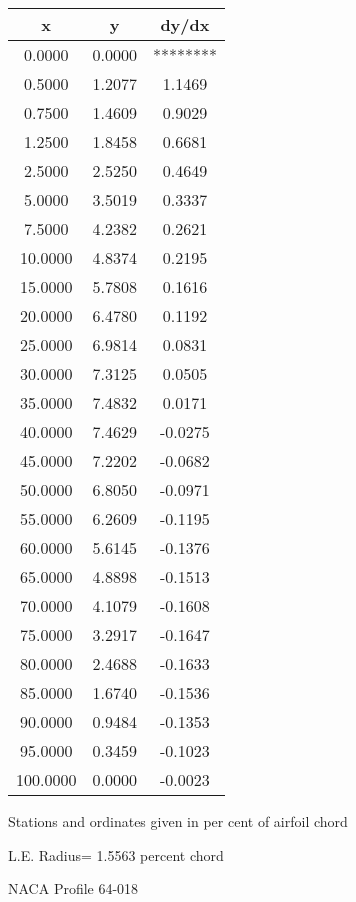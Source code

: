\documentclass[11pt]{book}
\begin{document}
 \vspace{8mm}
 \begin{tabular}{|c|c|c|} \hline 
  x  &  y  &  dy/dx \\
 \hline
0.0000 & 0.0000 & ******** \\
0.5000 & 1.2077 & 1.1469 \\
0.7500 & 1.4609 & 0.9029 \\
1.2500 & 1.8458 & 0.6681 \\
2.5000 & 2.5250 & 0.4649 \\
5.0000 & 3.5019 & 0.3337 \\
7.5000 & 4.2382 & 0.2621 \\
10.0000 & 4.8374 & 0.2195 \\
15.0000 & 5.7808 & 0.1616 \\
20.0000 & 6.4780 & 0.1192 \\
25.0000 & 6.9814 & 0.0831 \\
30.0000 & 7.3125 & 0.0505 \\
35.0000 & 7.4832 & 0.0171 \\
40.0000 & 7.4629 & -0.0275 \\
45.0000 & 7.2202 & -0.0682 \\
50.0000 & 6.8050 & -0.0971 \\
55.0000 & 6.2609 & -0.1195 \\
60.0000 & 5.6145 & -0.1376 \\
65.0000 & 4.8898 & -0.1513 \\
70.0000 & 4.1079 & -0.1608 \\
75.0000 & 3.2917 & -0.1647 \\
80.0000 & 2.4688 & -0.1633 \\
85.0000 & 1.6740 & -0.1536 \\
90.0000 & 0.9484 & -0.1353 \\
95.0000 & 0.3459 & -0.1023 \\
100.0000 & 0.0000 & -0.0023 \\
 \hline
 \end{tabular}
 \vspace{8mm}


Stations and ordinates given in per cent of airfoil chord 


L.E. Radius=  1.5563 percent chord
 \newpage
  \label{p64-018}
 \begin{Large}
 NACA Profile 64-018
 \end{Large}
  
\end{document}
